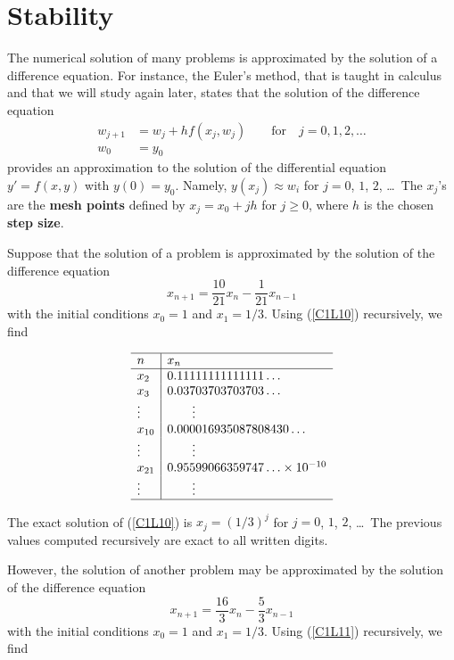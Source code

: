 \section{Stability}

The numerical solution of many problems is approximated by the
solution of a difference equation.  For instance, the Euler's method,
that is taught in calculus and that we will study again later, states
that the solution of the difference equation
\begin{align*}
w_{j+1} &= w_j + h f(x_j,w_j) \qquad \text{for} \quad j=0, 1, 2, \ldots \\
w_0 &= y_0
\end{align*}
provides an approximation to the solution of the differential equation 
$y'=f(x,y)$ with $y(0)=y_0$.  Namely, $y(x_j) \approx w_i$ for $j=0$,
$1$, $2$, \ldots\  The $x_j$'s are the
{\bfseries mesh points} defined
by $x_j = x_0 + j h$ for $j\geq 0$, where $h$ is the chosen
{\bfseries step size}.

Suppose that the solution of a problem is approximated by the solution
of the difference equation
\begin{equation} \label{C1L10}
x_{n+1} = \frac{10}{21} x_n - \frac{1}{21}x_{n-1}
\end{equation}
with the initial conditions $x_0 = 1$ and $x_1 = 1/3$.  Using
(\ref{C1L10}) recursively, we find

\[
\begin{array}{l|l}
\hline
n & x_n \\
\hline
x_2 & 0.11111111111111\ldots \\
x_3 & 0.03703703703703\ldots \\
\vdots & \qquad \vdots \\
x_{10} & 0.000016935087808430\ldots \\
\vdots & \qquad \vdots \\
x_{21} & 0.95599066359747\ldots \times 10^{-10} \\
\vdots & \qquad \vdots \\
\hline
\end{array}
\]

The exact solution of (\ref{C1L10}) is $x_j = (1/3)^j$ for
$j=0$, $1$, $2$, \ldots\  The previous values computed recursively are
exact to all written digits.

However, the solution of another problem may be approximated by the
solution of the difference equation
\begin{equation} \label{C1L11}
x_{n+1} = \frac{16}{3} x_n - \frac{5}{3}x_{n-1}
\end{equation}
with the initial conditions $x_0 = 1$ and $x_1 = 1/3$.
Using (\ref{C1L11}) recursively, we find

